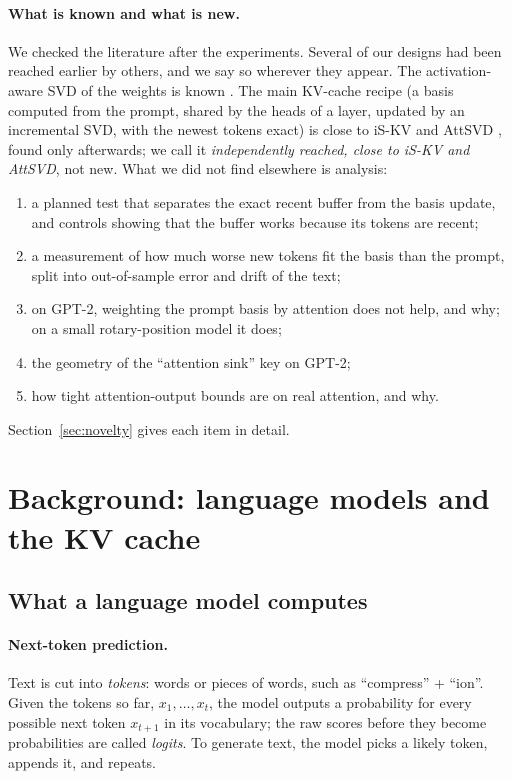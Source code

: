 \documentclass[10pt]{article}
\theoremstyle{plain}
\theoremstyle{definition}
\theoremstyle{remark}
\begin{document}
\paragraph{What is known and what is new.}
We checked the literature after the experiments. Several of our designs had been reached earlier by others, and we say so wherever they appear. The activation-aware SVD of the weights is known \cite{wang2025svdllm,yuan2023asvd}. The main KV-cache recipe (a basis computed from the prompt, shared by the heads of a layer, updated by an incremental SVD, with the newest tokens exact) is close to iS-KV \cite{iskv2026} and AttSVD \cite{attsvd2026}, found only afterwards; we call it \emph{independently reached, close to iS-KV and AttSVD}, not new. What we did not find elsewhere is analysis:
\begin{enumerate}[leftmargin=2em,itemsep=0pt]
\item a planned test that separates the exact recent buffer from the basis update, and controls showing that the buffer works because its tokens are recent;
\item a measurement of how much worse new tokens fit the basis than the prompt, split into out-of-sample error and drift of the text;
\item on GPT-2, weighting the prompt basis by attention does not help, and why; on a small rotary-position model it does;
\item the geometry of the ``attention sink'' key on GPT-2;
\item how tight attention-output bounds are on real attention, and why.
\end{enumerate}
Section~\ref{sec:novelty} gives each item in detail.


\section{Background: language models and the KV cache}
\label{sec:llm}

\subsection{What a language model computes}
\label{sec:transformer}

\paragraph{Next-token prediction.}
Text is cut into \emph{tokens}: words or pieces of words, such as ``compress'' + ``ion''. Given the tokens so far, $x_1,\dots,x_t$, the model outputs a probability for every possible next token $x_{t+1}$ in its vocabulary; the raw scores before they become probabilities are called \emph{logits}. To generate text, the model picks a likely token, appends it, and repeats.
\end{document}
